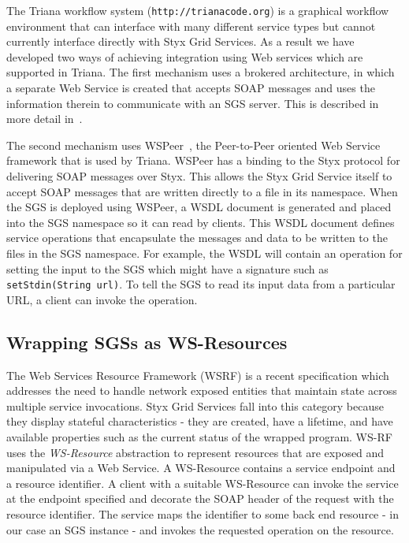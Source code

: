 \documentclass[a4paper]{article}
\begin{document}
The Triana workflow system (\texttt{http://trianacode.org}) is a graphical workflow environment that can interface with many different service types but cannot currently interface directly with Styx Grid Services.  As a result we have developed two ways of achieving integration using Web services which are supported in Triana. The first mechanism uses a brokered architecture, in which a separate Web Service is created that accepts SOAP messages and uses the information therein to communicate with an SGS server. This is described in more detail in~\cite{blower:2005}.

The second mechanism uses WSPeer~\cite{wspeer}, the Peer-to-Peer oriented Web Service framework that is used by Triana. WSPeer has a binding to the Styx protocol for delivering SOAP messages over Styx. This allows the Styx Grid Service itself to accept SOAP messages that are written directly to a file in its namespace.  When the SGS is deployed using WSPeer, a WSDL document is generated and placed into the SGS namespace so it can read by clients. This WSDL document defines service operations that encapsulate the messages and data to be written to the files in the SGS namespace. For example, the WSDL will contain an operation for setting the input to the SGS which might have a signature such as  \texttt{setStdin(String url)}. To tell the SGS to read its input data from a particular URL, a client can invoke the operation. 

\subsection{Wrapping SGSs as WS-Resources}\label{subsec:ws-resources}

The Web Services Resource Framework (WSRF) is a recent specification which addresses the need to handle network exposed entities that maintain state across multiple service invocations. Styx Grid Services fall into this category because they display stateful characteristics - they are created, have a lifetime, and have available properties such as the current status of the wrapped program. WS-RF uses the \textit{WS-Resource} abstraction to represent resources that are exposed and manipulated via a Web Service. A WS-Resource contains a service endpoint and a resource identifier. A client with a suitable WS-Resource can invoke the service at the endpoint specified and decorate the SOAP header of the request with the resource identifier. The service maps the identifier to some back end resource - in our case an SGS instance - and invokes the requested operation on the resource.
\end{document}
